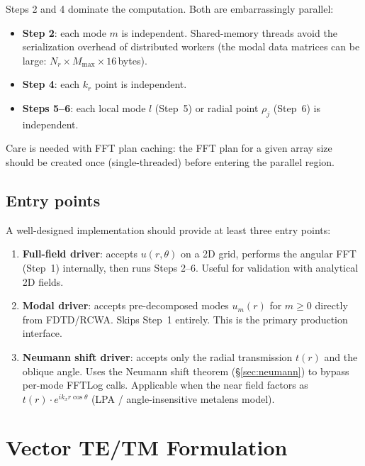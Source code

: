 \documentclass[11pt,a4paper]{article}
\begin{document}
Steps 2 and 4 dominate the computation.  Both are embarrassingly parallel:
\begin{itemize}[nosep]
  \item \textbf{Step 2}: each mode $m$ is independent.  Shared-memory threads
        avoid the serialization overhead of distributed workers (the modal data
        matrices can be large: $N_r \times M_{\max} \times 16$\,bytes).
  \item \textbf{Step 4}: each $k_r$ point is independent.
  \item \textbf{Steps 5--6}: each local mode $l$ (Step~5) or radial point $\rho_j$
        (Step~6) is independent.
\end{itemize}
Care is needed with FFT plan caching: the FFT plan for a given array size should
be created once (single-threaded) before entering the parallel region.

\subsection{Entry points}

A well-designed implementation should provide at least three entry points:
\begin{enumerate}[nosep]
  \item \textbf{Full-field driver}: accepts $u(r,\theta)$ on a 2D grid, performs
        the angular FFT (Step~1) internally, then runs Steps 2--6.
        Useful for validation with analytical 2D fields.
  \item \textbf{Modal driver}: accepts pre-decomposed modes $u_m(r)$
        for $m \ge 0$ directly from FDTD/RCWA.
        Skips Step~1 entirely.  This is the primary production interface.
  \item \textbf{Neumann shift driver}: accepts only the radial transmission $t(r)$
        and the oblique angle.  Uses the Neumann shift theorem (\S\ref{sec:neumann})
        to bypass per-mode FFTLog calls.  Applicable when the near field factors as
        $t(r)\cdot e^{ik_x r\cos\theta}$ (LPA / angle-insensitive metalens model).
\end{enumerate}


\appendix
\section{Vector TE/TM Formulation}
\label{app:TETM}
\end{document}

